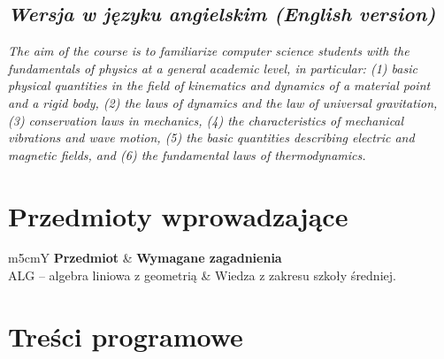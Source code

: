 \documentclass[12pt, a4paper]{article}
\newcommand{\thdrule}{\noalign{\global\setlength{\extrarowheight}{0pt}}}
\newcommand{\thdend}{\noalign{\global\setlength{\extrarowheight}{3pt}}}
\begin{document}
\subsection*{\textit{Wersja w języku angielskim (English version)}}

\textit{The aim of the course is to familiarize computer science students with the fundamentals of physics at a general academic level, in particular: (1) basic physical quantities in the field of kinematics and dynamics of a material point and a rigid body, (2) the laws of dynamics and the law of universal gravitation, (3) conservation laws in mechanics, (4) the characteristics of mechanical vibrations and wave motion, (5) the basic quantities describing electric and magnetic fields, and (6) the fundamental laws of thermodynamics.}


\section{Przedmioty wprowadzające}

{\scriptsize
\begin{tabularx}{\textwidth}{m{5cm}Y}
\thdrule\toprule
{} {\color{white}\textbf{Przedmiot}} & {\color{white}\textbf{Wymagane zagadnienia}} \\
\midrule\thdend
   ALG – algebra liniowa z geometrią & Wiedza z zakresu szkoły średniej. \\
\bottomrule
\end{tabularx}}

\section{Treści programowe}
\end{document}
